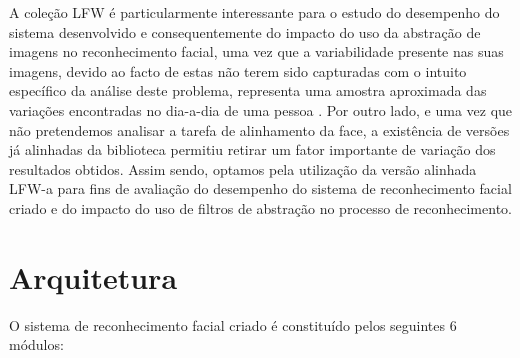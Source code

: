 A coleção LFW é particularmente interessante para o estudo do desempenho do sistema desenvolvido e consequentemente do impacto do uso da abstração de imagens no reconhecimento facial, uma vez que a variabilidade presente nas suas imagens, devido ao facto de estas não terem sido capturadas com o intuito específico da análise deste problema, representa uma amostra aproximada das variações encontradas no dia-a-dia de uma pessoa \cite{Huang2007}. Por outro lado, e uma vez que não pretendemos analisar a tarefa de alinhamento da face, a existência de versões já alinhadas da biblioteca permitiu retirar um fator importante de variação dos resultados obtidos. Assim sendo, optamos pela utilização da versão alinhada LFW-a para fins de avaliação do desempenho do sistema de reconhecimento facial criado e do impacto do uso de filtros de abstração no processo de reconhecimento.

\section{Arquitetura}
O sistema de reconhecimento facial criado é constituído pelos seguintes 6 módulos:

